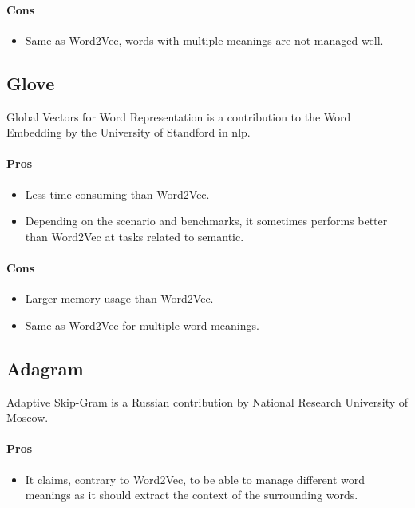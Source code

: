 \paragraph{Cons}
\begin{itemize}
    \setlength\itemsep{0em}
    \item Same as Word2Vec, words with multiple meanings are not managed well.
\end{itemize}


\subsection{Glove\cite{article:glove}}
Global Vectors for Word Representation is a contribution to the Word Embedding by the University of Standford in \gls{nlp}.
\paragraph{Pros}
\begin{itemize}
    \setlength\itemsep{0em}
    \item Less time consuming than Word2Vec.
    \item Depending on the scenario and benchmarks, it sometimes performs better than Word2Vec at tasks related to semantic.
\end{itemize}
\paragraph{Cons}
\begin{itemize}
    \setlength\itemsep{0em}
    \item Larger memory usage than Word2Vec.
    \item Same as Word2Vec for multiple word meanings.
\end{itemize}


\subsection{Adagram\cite{article:adagram}}
\label{sec:adagram}
Adaptive Skip-Gram is a Russian contribution by National Research University of Moscow.
\paragraph{Pros}
\begin{itemize}
    \setlength\itemsep{0em}
    \item It claims, contrary to Word2Vec, to be able to manage different word meanings as it should extract the context of the surrounding words.
\end{itemize}

